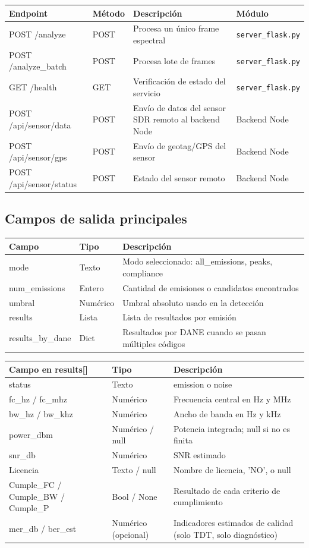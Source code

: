 \begin{tabular}{p{4cm}p{3cm}p{5cm}p{3cm}}
\textbf{Endpoint} & \textbf{Método} & \textbf{Descripción} & \textbf{Módulo} \\
\hline
POST /analyze & POST & Procesa un único frame espectral & \texttt{server\_flask.py} \\
POST /analyze\_batch & POST & Procesa lote de frames & \texttt{server\_flask.py} \\
GET /health & GET & Verificación de estado del servicio & \texttt{server\_flask.py} \\
POST /api/sensor/data & POST & Envío de datos del sensor SDR remoto al backend Node & Backend Node \\
POST /api/sensor/gps & POST & Envío de geotag/GPS del sensor & Backend Node \\
POST /api/sensor/status & POST & Estado del sensor remoto & Backend Node \\
\end{tabular}

\subsection{Campos de salida principales}

\begin{tabular}{p{4cm}p{4cm}p{6cm}}
\textbf{Campo} & \textbf{Tipo} & \textbf{Descripción} \\
\hline
mode & Texto & Modo seleccionado: all\_emissions, peaks, compliance \\
num\_emissions & Entero & Cantidad de emisiones o candidatos encontrados \\
umbral & Numérico & Umbral absoluto usado en la detección \\
results & Lista & Lista de resultados por emisión \\
results\_by\_dane & Dict & Resultados por DANE cuando se pasan múltiples códigos \\
\end{tabular}

\begin{tabular}{p{4cm}p{4cm}p{6cm}}
\textbf{Campo en results[] } & \textbf{Tipo} & \textbf{Descripción} \\
\hline
status & Texto & emission o noise \\
fc\_hz / fc\_mhz & Numérico & Frecuencia central en Hz y MHz \\
bw\_hz / bw\_khz & Numérico & Ancho de banda en Hz y kHz \\
power\_dbm & Numérico / null & Potencia integrada; null si no es finita \\
snr\_db & Numérico & SNR estimado \\
Licencia & Texto / null & Nombre de licencia, 'NO', o null \\
Cumple\_FC / Cumple\_BW / Cumple\_P & Bool / None & Resultado de cada criterio de cumplimiento \\
mer\_db / ber\_est & Numérico (opcional) & Indicadores estimados de calidad (solo TDT, solo diagnóstico) \\
\end{tabular}

